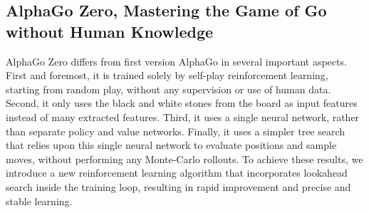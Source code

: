 \documentclass[12pt,a4paper]{article}
\begin{document}
\subsection{AlphaGo Zero, Mastering the Game of Go without Human Knowledge}
{
\hspace{0.6cm}AlphaGo Zero differs from first version AlphaGo in several important aspects. First and foremost, it is trained solely by self-play reinforcement learning, starting from random play, without any supervision or use of human data. Second, it only uses the black and white stones from the board as input features instead of many extracted features. Third, it uses a single neural network, rather than separate policy and value networks. Finally, it uses a simpler tree search that relies upon this single neural network to evaluate positions and sample moves, without performing any Monte-Carlo rollouts. To achieve these results, we introduce a new reinforcement learning algorithm that incorporates lookahead search inside the training loop, resulting in rapid improvement and precise and stable learning\cite{AlphaGoZero}.\par
}
\end{document}

